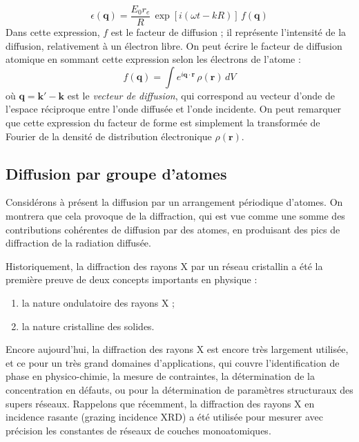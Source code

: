\begin{equation}
    \epsilon(\mathbf{q}) = \frac{E_0 r_e}{R}\, \exp [i(\omega t - k R)]  \, f(\mathbf{q})
\end{equation}
Dans cette expression, $f$ est le facteur de diffusion ; il représente l'intensité de la diffusion, relativement à un électron libre. On peut écrire le facteur de diffusion atomique en sommant cette expression selon les électrons de l'atome :
\begin{equation}
    f(\mathbf{q}) = \int e^{i\mathbf{q}\cdot\mathbf{r}}\, \rho(\mathbf{r}) \,dV
\end{equation}
où $\mathbf{q = k' - k}$ est le \emph{vecteur de diffusion}, qui correspond au vecteur d'onde de l'espace réciproque entre
l'onde diffusée et l'onde incidente. On peut remarquer que cette expression du facteur de forme est simplement la transformée de Fourier de la densité de distribution électronique $\rho(\mathbf{r})$.

\subsection{Diffusion par groupe d'atomes}

Considérons à présent la diffusion par un arrangement périodique d'atomes. On montrera que cela provoque de la diffraction, qui est vue comme une somme des contributions cohérentes de diffusion par des atomes, en produisant des pics de diffraction de la radiation diffusée.

Historiquement, la diffraction des rayons X par un réseau cristallin a été la première preuve de deux concepts importants en physique :
\begin{enumerate}
    \item la nature ondulatoire des rayons X ;
    \item la nature cristalline des solides.
\end{enumerate}
Encore aujourd'hui, la diffraction des rayons X est encore très largement utilisée, et ce pour un très grand domaines d'applications, qui couvre l'identification de phase en physico-chimie, la mesure de contraintes, la détermination de la concentration en défauts, ou pour la détermination de paramètres structuraux des supers réseaux. Rappelons que récemment, la diffraction des rayons X  en incidence rasante (grazing incidence XRD) a été utilisée pour mesurer avec précision les constantes de réseaux de couches monoatomiques.

